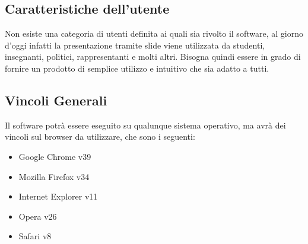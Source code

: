 \subsection{Caratteristiche dell'utente}
Non esiste una categoria di utenti definita ai quali sia rivolto il software, al giorno d'oggi infatti la presentazione tramite slide viene utilizzata da studenti, insegnanti, politici, rappresentanti e molti altri. Bisogna quindi essere in grado di fornire un prodotto di semplice utilizzo e intuitivo che sia adatto a tutti.

\subsection{Vincoli Generali}
Il software potrà essere eseguito su qualunque sistema operativo, ma avrà dei vincoli sul browser da utilizzare, che sono i seguenti:
\begin{itemize}
	\item Google Chrome v39
	\item Mozilla Firefox v34
	\item Internet Explorer v11
	\item Opera v26
	\item Safari v8
\end{itemize}
